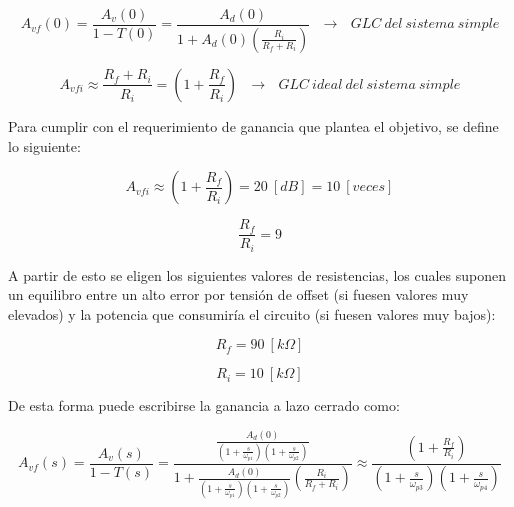 \documentclass[12pt,a4paper]{article}
\begin{document}
   \begin{equation}
        \label{eq_29}
A_{vf}(0) = \frac{A_v(0)}{1-T(0)} = \frac{A_d(0)}{1+A_d(0)\left(\frac{R_i}{R_f+R_i}\right)}~~~\xrightarrow{} ~~~GLC~del~sistema~simple
    \end{equation}

   \begin{equation}
        \label{eq_30}
A_{vfi} \approx \frac{R_f + R_i}{R_i} = \left(1 + \frac{R_f}{R_i}\right)~~~\xrightarrow{} ~~~GLC~ideal~del~sistema~simple
    \end{equation}
    \hspace{0.5 cm}


Para cumplir con el requerimiento de ganancia que plantea el objetivo, se define lo siguiente:

   \begin{equation}
        \label{eq_31}
A_{vfi} \approx \left(1 + \frac{R_f}{R_i}\right) = 20~[dB] = 10~[veces]
    \end{equation}

       \begin{equation}
        \label{eq_32}
\frac{R_f}{R_i} = 9 
    \end{equation}
    \hspace{0.5 cm}


A partir de esto se eligen los siguientes valores de resistencias, los cuales suponen un equilibro entre un alto error por tensión de offset (si fuesen valores muy elevados) y la potencia que consumiría el circuito (si fuesen valores muy bajos):

   \begin{equation}
        \label{eq_33}
R_f = 90~[k\Omega]
    \end{equation}

       \begin{equation}
        \label{eq_34}
R_i = 10~[k\Omega] 
    \end{equation}
    \hspace{0.5 cm}

De esta forma puede escribirse la ganancia a lazo cerrado como:

   \begin{equation}
        \label{eq_35}
A_{vf}(s) = \frac{A_v(s)}{1-T(s)} = \frac{\frac{A_d(0)}{\left(1+\frac{s}{\omega_{p1}}\right)\left(1+\frac{s}{\omega_{p2}}\right)}}{1+\frac{A_d(0)}{\left(1+\frac{s}{\omega_{p1}}\right)\left(1+\frac{s}{\omega_{p2}}\right)}\left(\frac{R_i}{R_f+R_i}\right)} \approx  \frac{\left(1 + \frac{R_f}{R_i}\right)}{\left(1+\frac{s}{\omega_{p3}}\right)\left(1+\frac{s}{\omega_{p4}}\right)}
    \end{equation}
    \hspace{0.5 cm}
\end{document}
